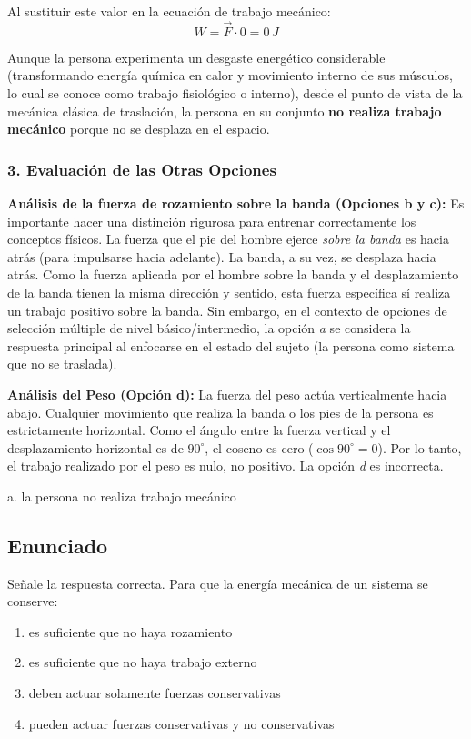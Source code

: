 \documentclass[12pt, a4paper]{article}
\begin{document}
Al sustituir este valor en la ecuación de trabajo mecánico:
$$W = \vec{F} \cdot 0 = 0 \, \si{J}$$

Aunque la persona experimenta un desgaste energético considerable (transformando energía química en calor y movimiento interno de sus músculos, lo cual se conoce como trabajo fisiológico o interno), desde el punto de vista de la mecánica clásica de traslación, la persona en su conjunto \textbf{no realiza trabajo mecánico} porque no se desplaza en el espacio.

\subsubsection*{3. Evaluación de las Otras Opciones}

\textbf{Análisis de la fuerza de rozamiento sobre la banda (Opciones b y c):}
Es importante hacer una distinción rigurosa para entrenar correctamente los conceptos físicos. La fuerza que el pie del hombre ejerce \textit{sobre la banda} es hacia atrás (para impulsarse hacia adelante). La banda, a su vez, se desplaza hacia atrás. Como la fuerza aplicada por el hombre sobre la banda y el desplazamiento de la banda tienen la misma dirección y sentido, esta fuerza específica sí realiza un trabajo positivo sobre la banda. Sin embargo, en el contexto de opciones de selección múltiple de nivel básico/intermedio, la opción \textit{a} se considera la respuesta principal al enfocarse en el estado del sujeto (la persona como sistema que no se traslada).

\textbf{Análisis del Peso (Opción d):}
La fuerza del peso actúa verticalmente hacia abajo. Cualquier movimiento que realiza la banda o los pies de la persona es estrictamente horizontal. Como el ángulo entre la fuerza vertical y el desplazamiento horizontal es de $90^\circ$, el coseno es cero ($\cos 90^\circ = 0$). Por lo tanto, el trabajo realizado por el peso es nulo, no positivo. La opción \textit{d} es incorrecta.

\begin{tcolorbox}[colback=green!5!white, colframe=green!50!black, title=Respuesta Correcta]
\centering \Large a. la persona no realiza trabajo mecánico
\end{tcolorbox}

\newpage

\subsection*{Enunciado}
Señale la respuesta correcta. Para que la energía mecánica de un sistema se conserve:
\begin{enumerate}[label=\alph*.]
    \item es suficiente que no haya rozamiento
    \item es suficiente que no haya trabajo externo
    \item deben actuar solamente fuerzas conservativas
    \item pueden actuar fuerzas conservativas y no conservativas
\end{enumerate}
\end{document}
